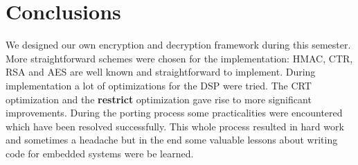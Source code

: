 \documentclass[a4paper]{article}
\begin{document}
\section{Conclusions}

We designed our own encryption and decryption framework during this semester. More straightforward schemes were chosen for the implementation: HMAC, CTR, RSA and AES are well known and straightforward to implement. During implementation a lot of optimizations for the DSP were tried. The CRT optimization and the \textbf{restrict} optimization gave rise to more significant improvements. During the porting process some practicalities were encountered which have been resolved successfully. This whole process resulted in hard work and sometimes a headache but in the end some valuable lessons about writing code for embedded systems were be learned.

\newpage
\end{document}
